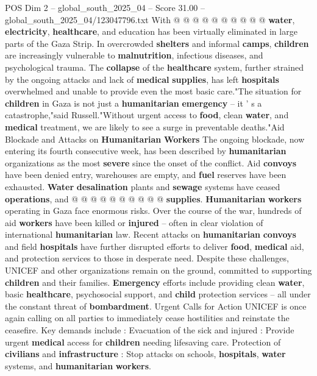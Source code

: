 \begin{textsample}{POS Dim 2 – global\_south\_2025\_04 – Score 31.00 – global\_south\_2025\_04/123047796.txt}
With @ @ @ @ @ @ @ @ @ @ \textbf{water}, \textbf{electricity}, \textbf{healthcare}, and education has been virtually eliminated in large parts of the Gaza Strip.
In overcrowded \textbf{shelters} and informal \textbf{camps}, \textbf{children} are increasingly vulnerable to \textbf{malnutrition}, infectious diseases, and psychological trauma.
The \textbf{collapse} of the \textbf{healthcare} system, further strained by the ongoing attacks and lack of \textbf{medical} \textbf{supplies}, has left \textbf{hospitals} overwhelmed and unable to provide even the most basic care."The situation for \textbf{children} in Gaza is not just a \textbf{humanitarian} \textbf{emergency} -- it ' s a catastrophe,"said Russell."Without urgent access to \textbf{food}, clean \textbf{water}, and \textbf{medical} treatment, we are likely to see a surge in preventable deaths."Aid Blockade and Attacks on \textbf{Humanitarian} \textbf{Workers} The ongoing blockade, now entering its fourth consecutive week, has been described by \textbf{humanitarian} organizations as the most \textbf{severe} since the onset of the conflict.
Aid \textbf{convoys} have been denied entry, warehouses are empty, and \textbf{fuel} reserves have been exhausted. \textbf{Water} \textbf{desalination} plants and \textbf{sewage} systems have ceased \textbf{operations}, and @ @ @ @ @ @ @ @ @ @ \textbf{supplies}. \textbf{Humanitarian} \textbf{workers} operating in Gaza face enormous risks.
Over the course of the war, hundreds of aid \textbf{workers} have been killed or \textbf{injured} -- often in clear violation of international \textbf{humanitarian} law.
Recent attacks on \textbf{humanitarian} \textbf{convoys} and field \textbf{hospitals} have further disrupted efforts to deliver \textbf{food}, \textbf{medical} aid, and protection services to those in desperate need.
Despite these challenges, UNICEF and other organizations remain on the ground, committed to supporting \textbf{children} and their families. \textbf{Emergency} efforts include providing clean \textbf{water}, basic \textbf{healthcare}, psychosocial support, and \textbf{child} protection services -- all under the constant threat of \textbf{bombardment}.
Urgent Calls for Action UNICEF is once again calling on all parties to immediately cease hostilities and reinstate the ceasefire.
Key demands include : Evacuation of the sick and injured : Provide urgent \textbf{medical} access for \textbf{children} needing lifesaving care.
Protection of \textbf{civilians} and \textbf{infrastructure} : Stop attacks on schools, \textbf{hospitals}, \textbf{water} systems, and \textbf{humanitarian} \textbf{workers}.

\end{textsample}
